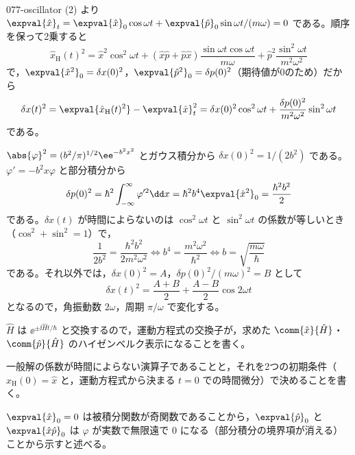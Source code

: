 \documentclass[uplatex,dvipdfmx,a4paper,11pt]{jsarticle}
\begin{document}
\begin{kaisetsu}{077-oscillator}
(2) より $\expval{\hat{x}}_{t}=\expval{\hat{x}}_{0}\cos\omega t+\expval{\hat{p}}_{0}\sin\omega t/(m\omega)=0$ である。順序を保って2乗すると
\[ \hat{x}_{\mathrm{H}}(t)^{2}=\hat{x}^{2}\cos^{2}\omega t+(\hat{x}\hat{p}+\hat{p}\hat{x})\frac{\sin\omega t\cos\omega t}{m\omega}+\hat{p}^{2}\frac{\sin^{2}\omega t}{m^{2}\omega^{2}} \]
で，$\expval{\hat{x}^{2}}_{0}=\delta x(0)^{2}$，$\expval{\hat{p}^{2}}_{0}=\delta p(0)^{2}$（期待値が0のため）だから
\[ \delta x(t)^{2}=\expval{\hat{x}_{\mathrm{H}}(t)^{2}}-\expval{\hat{x}}_{t}^{2}=\delta x(0)^{2}\cos^{2}\omega t+\frac{\delta p(0)^{2}}{m^{2}\omega^{2}}\sin^{2}\omega t \]
である。

 $\abs{\varphi}^{2}=(b^{2}/\pi)^{1/2}\ee^{-b^{2}x^{2}}$ とガウス積分から $\delta x(0)^{2}=1/(2b^{2})$ である。$\varphi'=-b^{2}x\varphi$ と部分積分から
\[ \delta p(0)^{2}=\hbar^{2}\int_{-\infty}^{\infty}\varphi'^{2}\dd x=\hbar^{2}b^{4}\expval{\hat{x}^{2}}_{0}=\frac{\hbar^{2}b^{2}}{2} \]
である。$\delta x(t)$ が時間によらないのは $\cos^{2}\omega t$ と $\sin^{2}\omega t$ の係数が等しいとき（$\cos^{2}+\sin^{2}=1$）で，
\[ \frac{1}{2b^{2}}=\frac{\hbar^{2}b^{2}}{2m^{2}\omega^{2}}\iff b^{4}=\frac{m^{2}\omega^{2}}{\hbar^{2}}\iff b=\sqrt{\frac{m\omega}{\hbar}} \]
である。それ以外では，$\delta x(0)^{2}=A$，$\delta p(0)^{2}/(m\omega)^{2}=B$ として
\[ \delta x(t)^{2}=\frac{A+B}{2}+\frac{A-B}{2}\cos2\omega t \]
となるので，角振動数 $2\omega$，周期 $\pi/\omega$ で変化する。
\begin{ronten}
  \item {} $\hat{H}$ は $\ee^{\pm\ii\hat{H}t/\hbar}$ と交換するので，運動方程式の交換子が，求めた $\comm{\hat{x}}{\hat{H}}$・$\comm{\hat{p}}{\hat{H}}$ のハイゼンベルク表示になることを書く。
  \item {} 一般解の係数が時間によらない演算子であることと，それを2つの初期条件（$\hat{x}_{\mathrm{H}}(0)=\hat{x}$ と，運動方程式から決まる $t=0$ での時間微分）で決めることを書く。
  \item {} $\expval{\hat{x}}_{0}=0$ は被積分関数が奇関数であることから，$\expval{\hat{p}}_{0}$ と $\expval{\hat{x}\hat{p}}_{0}$ は $\varphi$ が実数で無限遠で $0$ になる（部分積分の境界項が消える）ことから示すと述べる。

\end{ronten}
\end{kaisetsu}
\end{document}
